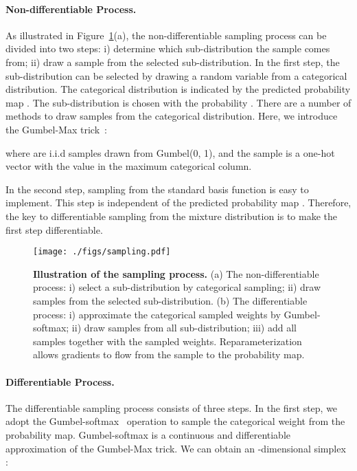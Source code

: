 \documentclass{article}
\begin{document}
\paragraph{Non-differentiable Process.} As illustrated in Figure~\ref{fig:samling}(a), the non-differentiable sampling process can be divided into two steps: i) determine which sub-distribution the sample comes from; ii) draw a sample from the selected sub-distribution. In the first step, the sub-distribution can be selected by drawing a random variable from a categorical distribution. The categorical distribution is indicated by the predicted probability map . The sub-distribution  is chosen with the probability . There are a number of methods to draw samples from the categorical distribution. Here, we introduce the Gumbel-Max trick~\cite{gumbel1954statistical,maddison2014sampling}:

where  are i.i.d samples drawn from Gumbel(0, 1), and the sample  is a one-hot vector with the value  in the maximum categorical column.

In the second step, sampling from the standard basis function is easy to implement. This step is independent of the predicted probability map . Therefore, the key to differentiable sampling from the mixture distribution is to make the first step differentiable.




\begin{figure}[t]
    \centering
\texttt{[image: ./figs/sampling.pdf]}
    \caption{\textbf{Illustration of the sampling process.} (a) The non-differentiable process: i) select a sub-distribution by categorical sampling; ii) draw samples from the selected sub-distribution. (b) The differentiable process: i) approximate the categorical sampled weights by Gumbel-softmax; ii) draw samples from all sub-distribution; iii) add all samples together with the sampled weights. Reparameterization allows gradients to flow from the sample to the probability map.}
    \label{fig:samling}
\end{figure}

\paragraph{Differentiable Process.}


The differentiable sampling process consists of three steps. In the first step, we adopt the Gumbel-softmax~\cite{jang2016categorical} operation to sample the categorical weight from the probability map. Gumbel-softmax is a continuous and differentiable approximation of the Gumbel-Max trick. We can obtain an -dimensional simplex :
\end{document}
